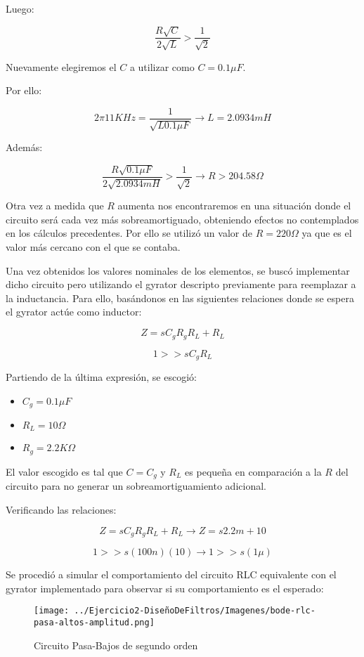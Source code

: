 Luego:

$$\frac{R\sqrt{C}}{2\sqrt{L}} > \frac{1}{\sqrt{2}}$$

Nuevamente elegiremos el $C$ a utilizar como $C=0.1\mu F$. 

Por ello:

$$2\pi 11KHz=\frac{1}{\sqrt{L0.1 \mu F}} \longrightarrow L = 2.0934 mH$$

Además:

$$\frac{R\sqrt{0.1\mu F}}{2\sqrt{2.0934mH}} > \frac{1}{\sqrt{2}} \longrightarrow R > 204.58 \Omega $$

Otra vez a medida que $R$ aumenta nos encontraremos en una situación donde el circuito será
cada vez más sobreamortiguado, obteniendo efectos no contemplados en los cálculos precedentes. 
Por ello se utilizó un valor de $R= 220 \Omega$ ya que es el valor más cercano con el que se contaba.

Una vez obtenidos los valores nominales de los elementos, se buscó implementar dicho circuito pero utilizando el gyrator descripto previamente
para reemplazar a la inductancia. Para ello, basándonos 
en las siguientes relaciones donde se espera el gyrator actúe como inductor:

$$Z=sC_gR_gR_L+R_L$$

$$1 >> sC_gR_L$$

Partiendo de la última expresión, se escogió:

\begin{itemize}
	\item $C_g=0.1 \mu F$
	\item $R_L=10 \Omega$
	\item $R_g=2.2K \Omega$
\end{itemize}

El valor escogido es tal que $C=C_g$ y $R_L$ es pequeña en comparación a la $R$ del circuito para no generar
un sobreamortiguamiento adicional.

Verificando las relaciones:

$$Z=sC_gR_gR_L+R_L \longrightarrow Z = s2.2m + 10$$

$$1 >> s(100n)(10) \longrightarrow 1  >> s(1\mu)$$

Se procedió a simular el comportamiento del circuito RLC equivalente con el gyrator implementado para observar si su comportamiento es el esperado:


\begin{figure}[H]
    \centering
    \texttt{[image: ../Ejercicio2-DiseñoDeFiltros/Imagenes/bode-rlc-pasa-altos-amplitud.png]}
    \caption{Circuito Pasa-Bajos de segundo orden}
\end{figure}

